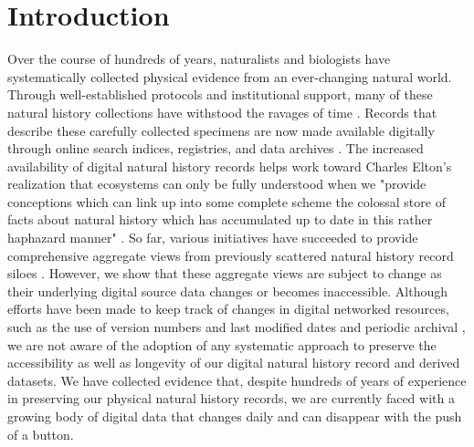 \section*{Introduction}
Over the course of hundreds of years, naturalists and biologists have systematically collected physical evidence from an ever-changing natural world. Through well-established protocols and institutional support, many of these natural history collections have withstood the ravages of time \citep{Hortal_2015,Davis_1996}. Records that describe these carefully collected specimens are now made available digitally through online search indices, registries, and data archives \citep{Page_2015}. The increased availability of digital natural history records helps work toward Charles Elton’s realization that ecosystems can only be fully understood when we "provide conceptions which can link up into some complete scheme the colossal store of facts about natural history which has accumulated up to date in this rather haphazard manner" \citep{Elton_1927}. So far, various initiatives have succeeded to provide comprehensive aggregate views from previously scattered natural history record siloes \citep{Rinaldo_2009,Michener_2011,Edwards_2000,matsunaga2013integrated,gbif_org_2019}. However, we show that these aggregate views are subject to change as their underlying digital source data changes or becomes inaccessible. Although efforts have been made to keep track of changes in digital networked resources, such as the use of version numbers and last modified dates \citep{Wieczorek_2012,Robertson_2014} and periodic archival \citep{Costello_2013},  we are not aware of the adoption of any systematic approach to preserve the accessibility as well as longevity of our digital natural history record and derived datasets. We have collected evidence that, despite hundreds of years of experience in preserving our physical natural history records, we are currently faced with a growing body of digital data that changes daily and can disappear with the push of a button.
